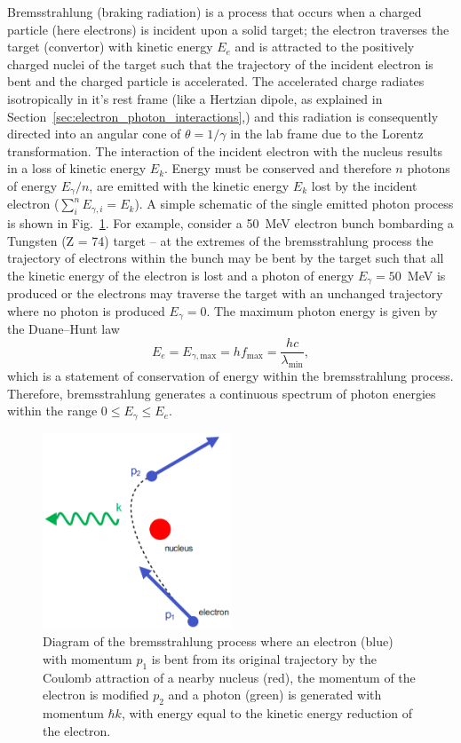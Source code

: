 \documentclass[../main.tex]{subfiles}
\begin{document}
Bremsstrahlung (braking radiation) is a process that occurs when a charged particle (here electrons) is incident upon a solid target; the electron traverses the target (convertor) with kinetic energy $E_{e}$ and is attracted to the positively charged nuclei of the target such that the trajectory of the incident electron is bent and the charged particle is accelerated. The accelerated charge radiates  isotropically in it's rest frame (like a Hertzian dipole, as explained in Section~\ref{sec:electron_photon_interactions},) and this radiation is consequently directed into an angular cone of $\theta=1/\gamma$ in the lab frame due to the Lorentz transformation. The interaction of the incident electron with the nucleus results in a loss of kinetic energy $E_{k}$. Energy must be conserved and therefore $n$ photons of energy $E_{\gamma}/n$, are emitted with the kinetic energy $E_{k}$ lost by the incident electron ($\sum_{i}^{n} E_{\gamma,i}=E_{k}$). A simple schematic of the single emitted photon process is shown in Fig.~\ref{fig:bremsstrahlung_diagram}. For example, consider a 50~\si{\mega\electronvolt} electron bunch bombarding a Tungsten (Z = 74) target -- at the extremes of the bremsstrahlung process the trajectory of electrons within the bunch may be bent by the target such that all the kinetic energy of the electron is lost and a photon of energy $E_{\gamma}=50$~\si{\mega\electronvolt} is produced or the electrons may traverse the target with an unchanged trajectory where no photon is produced $E_{\gamma}=0$. The maximum photon energy is given by the Duane--Hunt law \cite{duane1915xray}
\begin{equation}
E_{e} = E_{\gamma,\mathrm{max}} = hf_{\mathrm{max}} = \frac{hc}{\lambda_{\mathrm{min}}},
\label{eq:Duane_Hunt_law}    
\end{equation}
which is a statement of conservation of energy within the bremsstrahlung process. Therefore, bremsstrahlung generates a continuous spectrum of photon energies within the range $0 \leq E_{\gamma} \leq E_{e}$.
\begin{figure}[!h]
\centering
\includegraphics[width=0.5\textwidth]{Figures/DIANA_Inverse_Compton_Source_Design/Bremsstrahlung_fixed.pdf}
\caption{Diagram of the bremsstrahlung process where an electron (blue) with momentum $p_{1}$ is bent from its original trajectory by the Coulomb attraction of a nearby nucleus (red), the momentum of the electron is modified $p_{2}$ and a photon (green) is generated with momentum $\hbar k$, with energy equal to the kinetic energy reduction of the electron.}
\label{fig:bremsstrahlung_diagram}
\end{figure}
\end{document}
